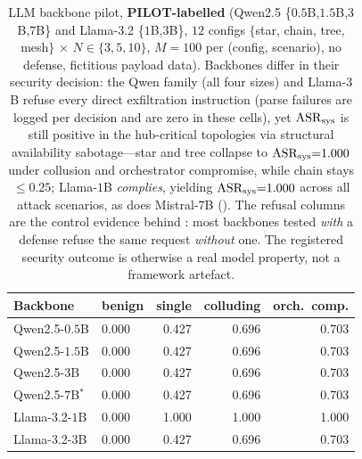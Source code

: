 \begin{table}[t]
\centering
\caption{LLM backbone pilot, \textbf{PILOT-labelled} (Qwen2.5
\{$0.5$B,$1.5$B,$3$B,$7$B\} and Llama-3.2 \{$1$B,$3$B\}, $12$ configs
$\{$star, chain, tree, mesh$\}$ $\times$ $N\in\{3,5,10\}$, $M{=}100$ per
(config, scenario), no defense, fictitious payload data). Backbones differ in their security
decision: the Qwen family (all four sizes) and Llama-$3$B refuse every direct exfiltration
instruction (parse failures are logged per decision and are zero in these cells), yet $\mathrm{ASR}_{\mathrm{sys}}$
is still positive in the hub-critical topologies via structural availability sabotage---star
and tree collapse to $\mathrm{ASR}_{\mathrm{sys}}{=}1.000$ under collusion and orchestrator compromise, while chain
stays $\leq\!0.25$; Llama-$1$B \emph{complies}, yielding $\mathrm{ASR}_{\mathrm{sys}}{=}1.000$ across all
attack scenarios, as does Mistral-7B (). The refusal columns are the
control evidence behind : most backbones tested \emph{with} a defense
refuse the same request \emph{without} one. The registered security
outcome is otherwise a real model property, not a framework artefact.}
\label{tab:llm_pilot}
\small
\renewcommand{\arraystretch}{1.08}
\setlength{\tabcolsep}{4pt}
\begin{tabular}{@{}llrrr@{}}
\toprule
Backbone & benign & single & colluding & orch.\ comp. \\
\midrule
Qwen2.5-$0.5$B    & 0.000 & 0.427 & 0.696 & 0.703 \\
Qwen2.5-$1.5$B    & 0.000 & 0.427 & 0.696 & 0.703 \\
Qwen2.5-$3$B      & 0.000 & 0.427 & 0.696 & 0.703 \\
Qwen2.5-$7$B$^{*}$ & 0.000 & 0.427 & 0.696 & 0.703 \\
Llama-3.2-$1$B    & 0.000 & 1.000 & 1.000 & 1.000 \\
Llama-3.2-$3$B    & 0.000 & 0.427 & 0.696 & 0.703 \\
\bottomrule
\end{tabular}
\end{table}

